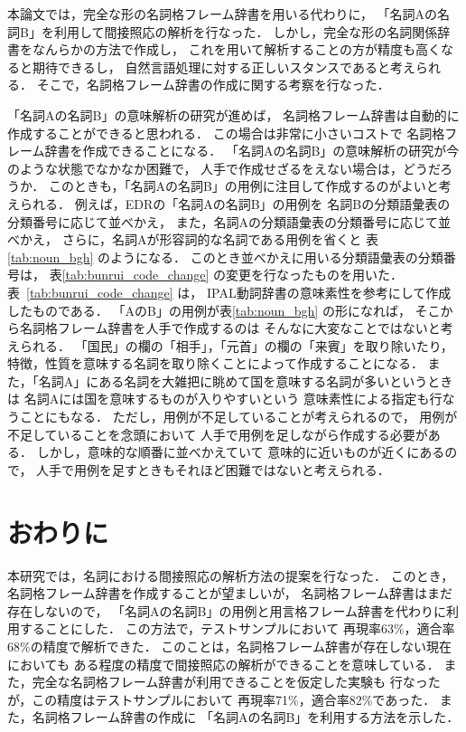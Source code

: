 本論文では，完全な形の名詞格フレーム辞書を用いる代わりに，
「名詞Aの名詞B」を利用して間接照応の解析を行なった．
しかし，完全な形の名詞関係辞書をなんらかの方法で作成し，
これを用いて解析することの方が精度も高くなると期待できるし，
自然言語処理に対する正しいスタンスであると考えられる．
そこで，名詞格フレーム辞書の作成に関する考察を行なった．

「名詞Aの名詞B」の意味解析の研究が進めば，
名詞格フレーム辞書は自動的に作成することができると思われる．
この場合は非常に小さいコストで
名詞格フレーム辞書を作成できることになる．
「名詞Aの名詞B」の意味解析の研究が今のような状態でなかなか困難で，
人手で作成せざるをえない場合は，どうだろうか．
このときも，「名詞Aの名詞B」の用例に注目して作成するのがよいと考えられる．
例えば，EDRの「名詞Aの名詞B」の用例を
名詞Bの分類語彙表\cite{bgh}の分類番号に応じて並べかえ，
また，名詞Aの分類語彙表の分類番号に応じて並べかえ，
さらに，名詞Aが形容詞的な名詞である用例を省くと
表\ref{tab:noun_bgh} のようになる．
このとき並べかえに用いる分類語彙表の分類番号は，
表\ref{tab:bunrui_code_change} の変更を行なったものを用いた．
表~\ref{tab:bunrui_code_change} は，
IPAL動詞辞書\cite{ipal}の意味素性を参考にして作成したものである．
「AのB」の用例が表\ref{tab:noun_bgh} の形になれば，
そこから名詞格フレーム辞書を人手で作成するのは
そんなに大変なことではないと考えられる．
「国民」の欄の「相手」，「元首」の欄の「来賓」を取り除いたり，
特徴，性質を意味する名詞を取り除くことによって作成することになる．
また，「名詞A」にある名詞を大雑把に眺めて国を意味する名詞が多いというときは
名詞Aには国を意味するものが入りやすいという
意味素性による指定も行なうことにもなる．
ただし，用例が不足していることが考えられるので，
用例が不足していることを念頭において
人手で用例を足しながら作成する必要がある．
しかし，意味的な順番に並べかえていて
意味的に近いものが近くにあるので，
人手で用例を足すときもそれほど困難ではないと考えられる．


\section{おわりに}

本研究では，名詞における間接照応の解析方法の提案を行なった．
このとき，名詞格フレーム辞書を作成することが望ましいが，
名詞格フレーム辞書はまだ存在しないので，
「名詞Aの名詞B」の用例と用言格フレーム辞書を代わりに利用することにした．
この方法で，テストサンプルにおいて
再現率63\%，適合率68\%の精度で解析できた．
このことは，名詞格フレーム辞書が存在しない現在においても
ある程度の精度で間接照応の解析ができることを意味している．
また，完全な名詞格フレーム辞書が利用できることを仮定した実験も
行なったが，この精度はテストサンプルにおいて
再現率71\%，適合率82\%であった．
また，名詞格フレーム辞書の作成に
「名詞Aの名詞B」を利用する方法を示した．



